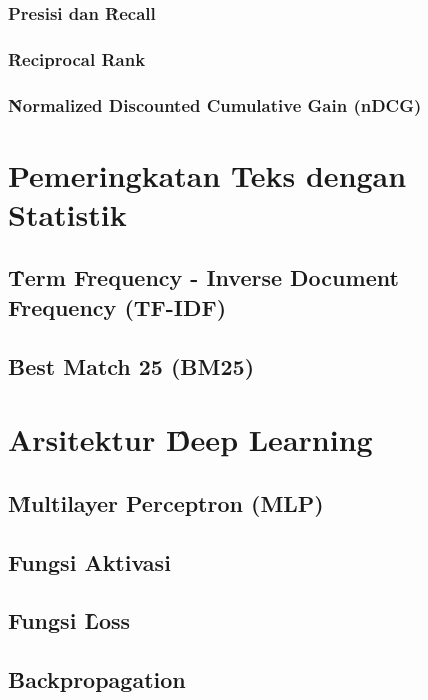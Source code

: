         \subsubsection{Presisi dan \f{Recall}}

        \subsubsection{\f{Reciprocal Rank}}

        \subsubsection{\f{Normalized Discounted Cumulative Gain} (nDCG)}


\section{Pemeringkatan Teks dengan Statistik}
    \subsection{\f{Term Frequency - Inverse Document Frequency} (TF-IDF)}
    \subsection{\f{Best Match 25} (BM25)}


\section{Arsitektur \f{Deep Learning}}

    \subsection{\f{Multilayer Perceptron} (MLP)}

    \subsection{Fungsi Aktivasi}

    \subsection{Fungsi \f{Loss}}
        
    \subsection{\f{Backpropagation}}

